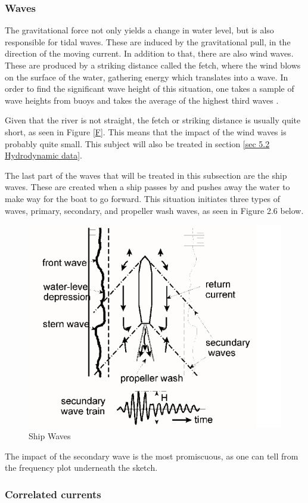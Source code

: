 \subsubsection{Waves}

The gravitational force not only yields a change in water level, but is also responsible for tidal waves. These are induced by the gravitational pull, in the direction of the moving current. 
In addition to that, there are also wind waves. These are produced by a striking distance called the fetch, where the wind blows on the surface of the water, gathering energy which translates into a wave. In order to find the significant wave height of this situation, one takes a sample of wave heights from buoys and takes the average of the highest third waves \autocite{jaimearrigaSlidesLecture2}.

Given that the river is not straight, the fetch or striking distance is usually quite short, as seen in Figure \ref{F}. This means that the impact of the wind waves is probably quite small. This subject will also be treated in section \ref{sec 5.2 Hydrodynamic data}.

The last part of the waves that will be treated in this subsection are the ship waves. These are created when a ship passes by and pushes away the water to make way for the boat to go forward. This situation initiates three types of waves, primary, secondary, and propeller wash waves\autocite{}, as seen in Figure 2.6 below.
\begin{figure}[H]
    \centering
    \includegraphics[width=0.5\linewidth]{figures/ch2/afbeelding.png}
    \caption{Ship Waves}
    \label{fig:placeholder}
\end{figure}
The impact of the secondary wave is the most promiscuous, as one can tell from the frequency plot underneath the sketch.



\subsubsection{Correlated currents}

